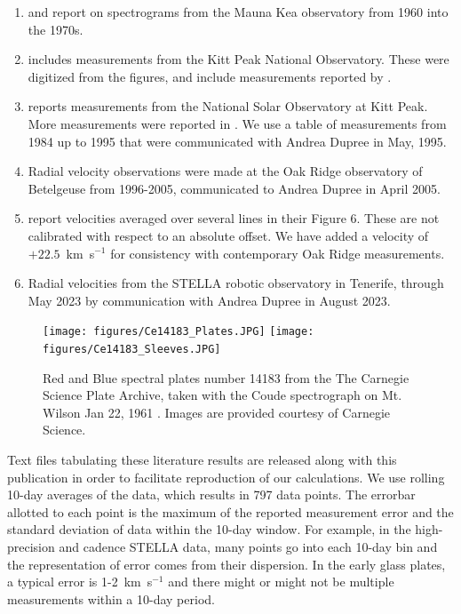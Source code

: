 \documentclass[twocolumn]{aastex631}
\begin{document}
\begin{enumerate}
    \item \citet{1975ApJ...198..369B} and \citet{1979ApJ...232..485B} report on spectrograms from the Mauna Kea observatory from 1960 into the 1970s. 

    \item \citet{1984PASP...96..366G} includes measurements from the Kitt Peak National Observatory. These were digitized from the figures, and include measurements reported by \citep{1979QJRAS..20..361G}. 


    \item 
    \citet{1989AJ.....98.2233S} reports measurements from the National Solar Observatory at Kitt Peak. More measurements were reported in \citet{1998ASPC..154..393U}. We use a table of measurements from 1984 up to 1995 that were communicated  with Andrea Dupree in May, 1995. 


    \item Radial velocity observations were made at the Oak Ridge observatory of Betelgeuse from 1996-2005, communicated to Andrea Dupree in April 2005. 

    \item \citet{2008AJ....135.1450G} report velocities averaged over several lines in their Figure 6. These are not calibrated with respect to an absolute offset. We have added a velocity of $+22.5$~km~s$^{-1}$ for consistency with contemporary Oak Ridge measurements. 

    \item \citet{2022csss.confE.185G} Radial velocities from the STELLA robotic observatory in Tenerife, through May 2023 by communication with Andrea Dupree in August 2023. 



\end{enumerate}

\begin{figure}
    \centering
    \texttt{[image: figures/Ce14183\_Plates.JPG]}
    \texttt{[image: figures/Ce14183\_Sleeves.JPG]}
    \caption{Red and Blue spectral plates number 14183 from the The Carnegie Science Plate Archive, taken with the Coude spectrograph on Mt. Wilson Jan 22, 1961 \citep{1962ApJ...136..844W}. Images are provided courtesy of Carnegie Science.  }
    \label{fig:Carnegie}
\end{figure}

Text files tabulating these literature results are released along with this publication in order to facilitate reproduction of our calculations. We use rolling 10-day averages of the data, which results in 797 data points. The errorbar allotted to each point is the maximum of the reported measurement error and the standard deviation of data within the 10-day window. For example, in the high-precision and cadence STELLA data, many points go into each 10-day bin and the representation of error comes from their dispersion. In the early glass plates, a typical error is 1-2~km~s$^{-1}$ and there might or might not be multiple measurements within a 10-day period. 
\end{document}
